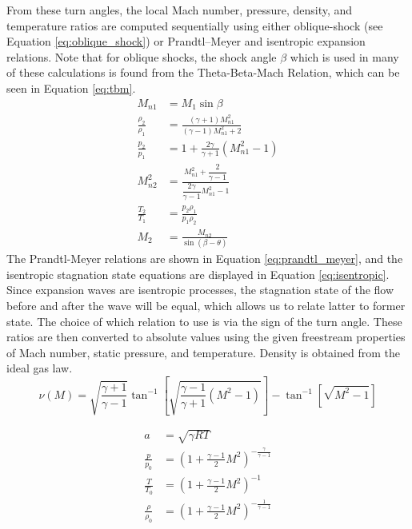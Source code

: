 \documentclass[11pt]{article}
\begin{document}
From these turn angles, the local Mach number, pressure, density, and temperature ratios are computed sequentially using either oblique-shock (see Equation \ref{eq:oblique_shock}) or Prandtl–Meyer and isentropic expansion relations. Note that for oblique shocks, the shock angle $\beta$ which is used in many of these calculations is found from the Theta-Beta-Mach Relation, which can be seen in Equation \ref{eq:tbm}.
\begin{subequations}
\begin{align}
M_{n1} &= M_1 \sin \beta \\[6pt]
\frac{\rho_2}{\rho_1} &= \frac{(\gamma + 1) M_{n1}^2}{(\gamma - 1) M_{n1}^2 + 2} \\[6pt]
\frac{p_2}{p_1} &= 1 + \frac{2 \gamma}{\gamma + 1} (M_{n1}^2 - 1) \\[6pt]
M_{n2}^2 &= \frac{M_{n1}^2 + \dfrac{2}{\gamma - 1}}{\dfrac{2 \gamma}{\gamma - 1} M_{n1}^2 - 1} \\[6pt]
\frac{T_2}{T_1} &= \frac{p_2 \rho_1}{p_1 \rho_2} \\[6pt]
M_2 &= \frac{M_{n2}}{\sin(\beta - \theta)}
\end{align}
\label{eq:oblique_shock}
\end{subequations}
The Prandtl-Meyer relations are shown in Equation \ref{eq:prandtl_meyer}, and the isentropic stagnation state equations are displayed in Equation \ref{eq:isentropic}. Since expansion waves are isentropic processes, the stagnation state of the flow before and after the wave will be equal, which allows us to relate latter to former state. The choice of which relation to use is via the sign of the turn angle. These ratios are then converted to absolute values using the given freestream properties of Mach number, static pressure, and temperature. Density is obtained from the ideal gas law.
\begin{equation}
\nu(M) = 
\sqrt{\frac{\gamma + 1}{\gamma - 1}} 
\tan^{-1} \!\left[
\sqrt{\frac{\gamma - 1}{\gamma + 1} (M^2 - 1)}
\right] - \tan^{-1} \!\left[ \sqrt{M^2 - 1} \right]
\label{eq:prandtl_meyer}
\end{equation}

\begin{subequations}
\begin{align}
a &= \sqrt{\gamma R T} \\
\frac{p}{p_0} &= \left( 1 + \frac{\gamma - 1}{2} M^2 \right)^{-\frac{\gamma}{\gamma - 1}} \\
\frac{T}{T_0} &= \left( 1 + \frac{\gamma - 1}{2} M^2 \right)^{-1}\\
\frac{\rho}{\rho_0} &= \left( 1 + \frac{\gamma - 1}{2} M^2 \right)^{-\frac{1}{\gamma - 1}} 
\end{align}
\label{eq:isentropic}
\end{subequations}
\end{document}
